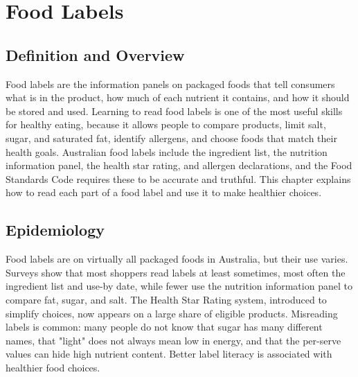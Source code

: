 \chapter{Food Labels}

\section*{Definition and Overview}
Food labels are the information panels on packaged foods that tell consumers what is in the product, how much of each nutrient it contains, and how it should be stored and used. Learning to read food labels is one of the most useful skills for healthy eating, because it allows people to compare products, limit salt, sugar, and saturated fat, identify allergens, and choose foods that match their health goals. Australian food labels include the ingredient list, the nutrition information panel, the health star rating, and allergen declarations, and the Food Standards Code requires these to be accurate and truthful. This chapter explains how to read each part of a food label and use it to make healthier choices.

\section*{Epidemiology}
Food labels are on virtually all packaged foods in Australia, but their use varies. Surveys show that most shoppers read labels at least sometimes, most often the ingredient list and use-by date, while fewer use the nutrition information panel to compare fat, sugar, and salt. The Health Star Rating system, introduced to simplify choices, now appears on a large share of eligible products. Misreading labels is common: many people do not know that sugar has many different names, that "light" does not always mean low in energy, and that the per-serve values can hide high nutrient content. Better label literacy is associated with healthier food choices.

